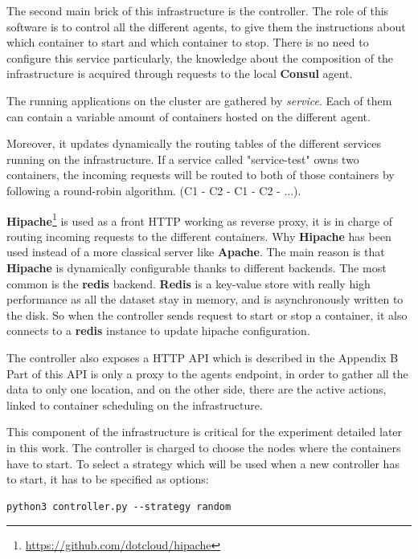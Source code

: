 The second main brick of this infrastructure is the controller. The role of
this software is to control all the different agents, to give them the
instructions about which container to start and which container to stop. There
is no need to configure this service particularly, the knowledge about the
composition of the infrastructure is acquired through requests to the local
\textbf{Consul} agent.

The running applications on the cluster are gathered by \textit{service}. Each
of them can contain a variable amount of containers hosted on the different agent.

Moreover, it updates dynamically the routing tables of the different services
running on the infrastructure. If a service called "service-test" owns two containers,
the incoming requests will be routed to both of those containers by following a
round-robin algorithm. (C1 - C2 - C1 - C2 - ...).

\textbf{Hipache}\footnote{\url{https://github.com/dotcloud/hipache}} is used as
a front HTTP working as reverse proxy, it is in charge of routing incoming
requests to the different containers.  Why \textbf{Hipache} has been used
instead of a more classical server like \textbf{Apache}. The main reason is
that \textbf{Hipache} is dynamically configurable thanks to different backends.
The most common is the \textbf{redis} backend. \textbf{Redis} is a key-value
store with really high performance as all the dataset stay in memory, and is
asynchronously written to the disk. So when the controller sends request to
start or stop a container, it also connects to a \textbf{redis} instance to
update hipache configuration.

The controller also exposes a HTTP API which is described in the Appendix
B~ Part of this API is only a proxy to the agents
endpoint, in order to gather all the data to only one location, and  on the
other side, there are the active actions, linked to container scheduling on the
infrastructure.

This component of the infrastructure is critical for the experiment detailed
later in this work. The controller is charged to choose the nodes where the
containers have to start. To select a strategy which will be used when a new
controller has to start, it has to be specified as options:

\begin{lstlisting}
python3 controller.py --strategy random
\end{lstlisting}

